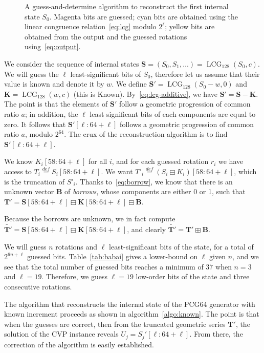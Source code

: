 \documentclass[submission,svgnames,journal=tosc]{iacrtrans}
\DeclareMathOperator{\LCG}{LCG}
\begin{document}
\begin{figure}
\begin{center}
\end{center}
\caption{A guess-and-determine algorithm to reconstruct the first internal state
  $S_0$. Magenta bits are guessed; cyan bits are obtained using the linear
  congruence relation~\eqref{eq:lcg} modulo $2^\ell$; yellow bits are obtained
  from the output and the guessed rotations using~\eqref{eq:output}.}
\label{fig:Cknown}
\end{figure}

We consider the sequence of internal states
$\mathbf{S} = (S_0, S_1, \dots) = \LCG_{128}(S_0, c)$. We will guess the $\ell$
least-significant bits of $S_0$, therefore let us assume that their value is
known and denote it by $w$. We define $\mathbf{S}' = \LCG_{128}(S_0 - w, 0)$ and
$\mathbf{K} = \LCG_{128}(w, c)$ (this is Known). By~\eqref{eq:lcg-additive}, we
have $\mathbf{S}' = \mathbf{S} - \mathbf{K}$. The point is that the elements of
$\mathbf{S}'$ follow a geometric progression of common ratio $a$; in addition,
the $\ell$ least significant bits of each components are equal to zero. It
follows that $\mathbf{S}'[\ell:64+\ell]$ follows a geometric progression of
common ratio $a$, modulo $2^{64}$. The crux of the reconstruction algorithm is
to find $\mathbf{S}'[\ell:64+\ell]$.

We know $K_i[58:64+\ell]$ for all $i$, and for each guessed rotation $r_i$ we
have access to $T_i \stackrel{def}{=} S_i[58:64+\ell]$.  We want
$T'_i \stackrel{def}{=} (S_i \boxminus K_i)[58:64+\ell]$, which is the
truncation of $S'_i$. Thanks to~\eqref{eq:borrow}, we know that there is an
unknown vector $\mathbf{B}$ of \emph{borrows}, whose components are either 0 or
1, such that
$\mathbf{T'} = \mathbf{S}[58:64+\ell] \boxminus \mathbf{K}[58:64+\ell] \boxminus
\mathbf{B}$.

Because the borrows are unknown, we in fact compute
$\widetilde{\mathbf{T}'} = \mathbf{S}[58:64+\ell] \boxminus
\mathbf{K}[58:64+\ell]$, and clearly
$\widetilde{\mathbf{T}'} = \mathbf{T}' \boxplus \mathbf{B}$.

We will guess $n$ rotations and $\ell$ least-significant bits of the state, for
a total of $2^{6n + \ell}$ guessed bits. Table~\ref{tab:babai} gives a
lower-bound on $\ell$ given $n$, and we see that the total number of guessed
bits reaches a minimum of $37$ when $n=3$ and $\ell=19$. Therefore, we guess
$\ell = 19$ low-order bits of the state and three consecutive rotations.

The algorithm that reconstructs the internal state of the \textsf{PCG64}
generator with known increment proceeds as shown in
algorithm~\ref{algo:known}. The point is that when the guesses are correct, then
from the truncated geometric series $\mathbf{T'}$, the solution of the CVP
instance reveals $U_j = S_j'[\ell:64+\ell]$. From there, the correction of the
algorithm is easily established.
\end{document}
